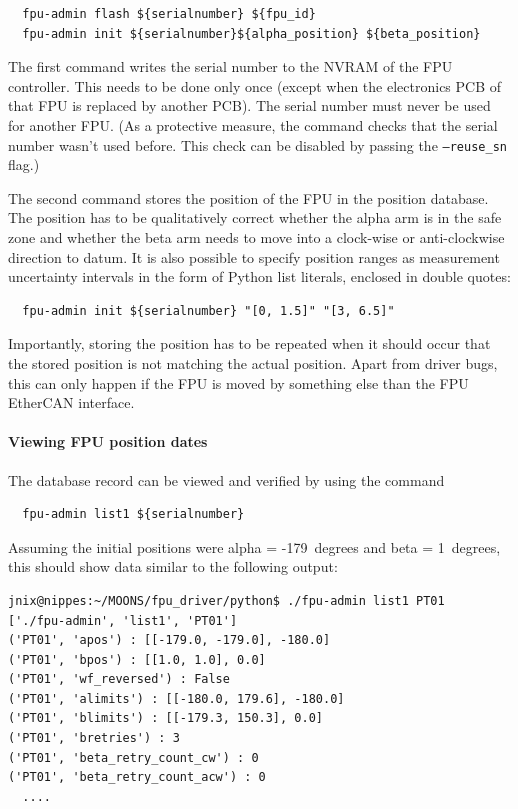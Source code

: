\documentclass[fontsize=12,a4paper]{scrreprt}
\begin{document}
\begin{verbatim}
  fpu-admin flash ${serialnumber} ${fpu_id}
  fpu-admin init ${serialnumber}${alpha_position} ${beta_position}
\end{verbatim}

The first command writes the serial number to the NVRAM of the FPU
controller. This needs to be done only once (except when the
electronics PCB of that FPU is replaced by another PCB). The serial
number must never be used for another FPU. (As a protective measure,
the command checks that the serial number wasn't used before. This
check can be disabled by passing the \texttt{--reuse\_sn} flag.)

The second command stores the position of the FPU in the position
database. The position has to be qualitatively correct whether the
alpha arm is in the safe zone and whether the beta arm needs to move
into a clock-wise or anti-clockwise direction to datum. It is also
possible to specify position ranges as measurement uncertainty
intervals in the form of Python list literals, enclosed in double
quotes:
\begin{verbatim}
  fpu-admin init ${serialnumber} "[0, 1.5]" "[3, 6.5]"
\end{verbatim}


Importantly, storing the position has to be repeated when it should
occur that the stored position is not matching the actual
position. Apart from driver bugs, this can only happen if the FPU is
moved by something else than the FPU EtherCAN interface.

\paragraph{Viewing FPU position dates}

The database record can be viewed and verified by using the command

\begin{verbatim}
  fpu-admin list1 ${serialnumber}
\end{verbatim}

Assuming the initial positions were alpha = -179\degree\ degrees and beta =
1\degree\ degrees, this should show data similar to the following output:

\begin{verbatim}
jnix@nippes:~/MOONS/fpu_driver/python$ ./fpu-admin list1 PT01
['./fpu-admin', 'list1', 'PT01']
('PT01', 'apos') : [[-179.0, -179.0], -180.0]
('PT01', 'bpos') : [[1.0, 1.0], 0.0]
('PT01', 'wf_reversed') : False
('PT01', 'alimits') : [[-180.0, 179.6], -180.0]
('PT01', 'blimits') : [[-179.3, 150.3], 0.0]
('PT01', 'bretries') : 3
('PT01', 'beta_retry_count_cw') : 0
('PT01', 'beta_retry_count_acw') : 0
  ....
\end{verbatim}
\end{document}

